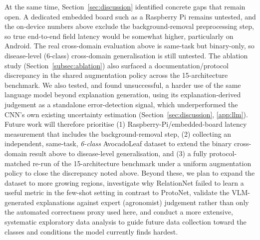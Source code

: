 At the same time, Section~\ref{sec:discussion} identified concrete gaps that remain open. A dedicated embedded board such as a Raspberry Pi remains untested, and the on-device numbers above exclude the background-removal preprocessing step, so true end-to-end field latency would be somewhat higher, particularly on Android. The real cross-domain evaluation above is same-task but binary-only, so disease-level (6-class) cross-domain generalisation is still untested. The ablation study (Section~\ref{subsec:ablation}) also surfaced a documentation/protocol discrepancy in the shared augmentation policy across the 15-architecture benchmark. We also tested, and found unsuccessful, a harder use of the same language model beyond explanation generation, using its explanation-derived judgement as a standalone error-detection signal, which underperformed the CNN's own existing uncertainty estimation (Section~\ref{sec:discussion}, \ref{app:llm}). Future work will therefore prioritise (1) Raspberry-Pi/embedded-board latency measurement that includes the background-removal step, (2) collecting an independent, same-task, \emph{6-class} AvocadoLeaf dataset to extend the binary cross-domain result above to disease-level generalisation, and (3) a fully protocol-matched re-run of the 15-architecture benchmark under a uniform augmentation policy to close the discrepancy noted above. Beyond these, we plan to expand the dataset to more growing regions, investigate why RelationNet failed to learn a useful metric in the few-shot setting in contrast to ProtoNet, validate the VLM-generated explanations against expert (agronomist) judgement rather than only the automated correctness proxy used here, and conduct a more extensive, systematic exploratory data analysis to guide future data collection toward the classes and conditions the model currently finds hardest.
